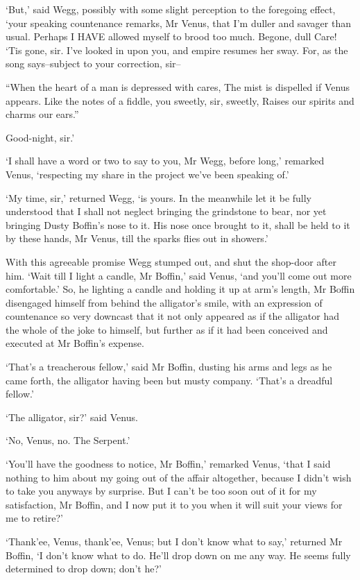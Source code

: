 ‘But,’ said Wegg, possibly with some slight perception to the foregoing
effect, ‘your speaking countenance remarks, Mr Venus, that I’m duller
and savager than usual. Perhaps I HAVE allowed myself to brood too much.
Begone, dull Care! ‘Tis gone, sir. I’ve looked in upon you, and empire
resumes her sway. For, as the song says--subject to your correction,
sir--

     “When the heart of a man is depressed with cares,
     The mist is dispelled if Venus appears.
     Like the notes of a fiddle, you sweetly, sir, sweetly,
     Raises our spirits and charms our ears.”

Good-night, sir.’

‘I shall have a word or two to say to you, Mr Wegg, before long,’
remarked Venus, ‘respecting my share in the project we’ve been speaking
of.’

‘My time, sir,’ returned Wegg, ‘is yours. In the meanwhile let it be
fully understood that I shall not neglect bringing the grindstone to
bear, nor yet bringing Dusty Boffin’s nose to it. His nose once brought
to it, shall be held to it by these hands, Mr Venus, till the sparks
flies out in showers.’

With this agreeable promise Wegg stumped out, and shut the shop-door
after him. ‘Wait till I light a candle, Mr Boffin,’ said Venus, ‘and
you’ll come out more comfortable.’ So, he lighting a candle and holding
it up at arm’s length, Mr Boffin disengaged himself from behind the
alligator’s smile, with an expression of countenance so very downcast
that it not only appeared as if the alligator had the whole of the joke
to himself, but further as if it had been conceived and executed at Mr
Boffin’s expense.

‘That’s a treacherous fellow,’ said Mr Boffin, dusting his arms and legs
as he came forth, the alligator having been but musty company. ‘That’s a
dreadful fellow.’

‘The alligator, sir?’ said Venus.

‘No, Venus, no. The Serpent.’

‘You’ll have the goodness to notice, Mr Boffin,’ remarked Venus, ‘that I
said nothing to him about my going out of the affair altogether, because
I didn’t wish to take you anyways by surprise. But I can’t be too soon
out of it for my satisfaction, Mr Boffin, and I now put it to you when
it will suit your views for me to retire?’

‘Thank’ee, Venus, thank’ee, Venus; but I don’t know what to say,’
returned Mr Boffin, ‘I don’t know what to do. He’ll drop down on me any
way. He seems fully determined to drop down; don’t he?’

